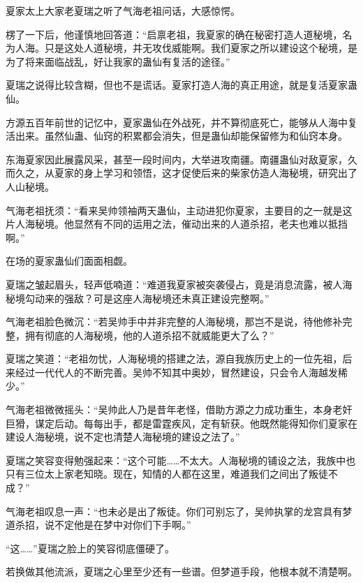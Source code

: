
\begin{this_body}

夏家太上大家老夏瑞之听了气海老祖问话，大感惊愕。

楞了一下后，他谨慎地回答道：“启禀老祖，我夏家的确在秘密打造人道秘境，名为人海。只是这处人道秘境，并无攻伐威能啊。我们夏家之所以建设这个秘境，是为了将来面临战乱，好让我家的蛊仙有复活的途径。”

夏瑞之说得比较含糊，但也不是谎话。夏家打造人海的真正用途，就是复活夏家蛊仙。

方源五百年前世的记忆中，夏家蛊仙在外战死，并不算彻底死亡，能够从人海中复活出来。虽然仙蛊、仙窍的积累都会消失，但是蛊仙却能保留修为和仙窍本身。

东海夏家因此展露风采，甚至一段时间内，大举进攻南疆。南疆蛊仙对敌夏家，久而久之，从夏家的身上学习和领悟，这才促使后来的柴家仿造人海秘境，研究出了人山秘境。

气海老祖抚须：“看来吴帅领袖两天蛊仙，主动进犯你夏家，主要目的之一就是这片人海秘境。他显然有不同的运用之法，催动出来的人道杀招，老夫也难以抵挡啊。”

在场的夏家蛊仙们面面相觑。

夏瑞之皱起眉头，轻声低喃道：“难道我夏家被突袭侵占，竟是消息流露，被人海秘境勾动来的强敌？可是这座人海秘境还未真正建设完整啊。”

气海老祖脸色微沉：“若吴帅手中并非完整的人海秘境，那岂不是说，待他修补完整，拥有彻底的人海秘境，他的人道杀招不就威能更大了么？”

夏瑞之笑道：“老祖勿忧，人海秘境的搭建之法，源自我族历史上的一位先祖，后来经过一代代人的不断完善。吴帅不知其中奥妙，冒然建设，只会令人海越发稀少。”

气海老祖微微摇头：“吴帅此人乃是昔年老怪，借助方源之力成功重生，本身老奸巨猾，谋定后动。每每出手，都是雷霆疾风，定有斩获。他既然能得知你们夏家在建设人海秘境，说不定也清楚人海秘境的建设之法了。”

夏瑞之笑容变得勉强起来：“这个可能……不太大。人海秘境的铺设之法，我族中也只有三位太上家老知晓。现在，知情的人都在这里，难道我们之间出了叛徒不成？”

气海老祖叹息一声：“也未必是出了叛徒。你们可别忘了，吴帅执掌的龙宫具有梦道杀招，说不定他是在梦中对你们下手啊。”

“这……”夏瑞之脸上的笑容彻底僵硬了。

若换做其他流派，夏瑞之心里至少还有一些谱。但梦道手段，他根本就不清楚啊。


\end{this_body}

